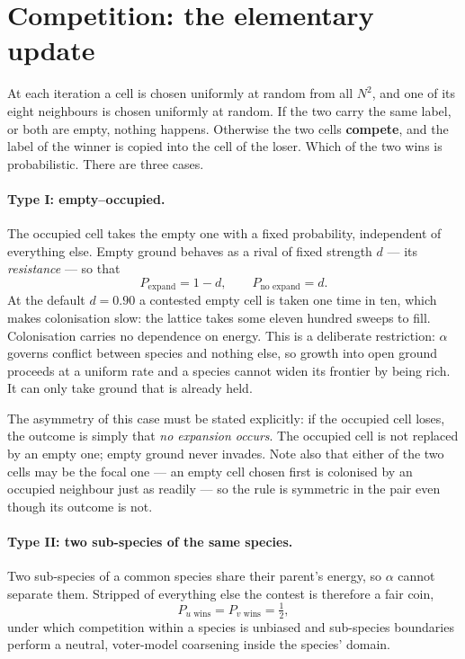 \documentclass[11pt,a4paper]{article}
\begin{document}
\section{Competition: the elementary update}
\label{sec:competition}

At each iteration a cell is chosen uniformly at random from all $N^2$, and one of its
eight neighbours is chosen uniformly at random. If the two carry the same label, or both
are empty, nothing happens. Otherwise the two cells \textbf{compete}, and the label of
the winner is copied into the cell of the loser. Which of the two wins is probabilistic.
There are three cases.

\paragraph{Type I: empty--occupied.} The occupied cell takes the empty one with a fixed
probability, independent of everything else. Empty ground behaves as a rival of fixed
strength $d$ --- its \emph{resistance} --- so that
\begin{equation}
  P_{\text{expand}} = 1 - d,
  \qquad
  P_{\text{no expand}} = d.
  \label{eq:typeI}
\end{equation}
At the default $d = 0.90$ a contested empty cell is taken one time in ten, which makes
colonisation slow: the lattice takes some eleven hundred sweeps to fill.
Colonisation carries no dependence on energy. This is a deliberate restriction: $\alpha$
governs conflict between species and nothing else, so growth into open ground proceeds at a
uniform rate and a species cannot widen its frontier by being rich. It can only take ground
that is already held.

The asymmetry of this case must be stated explicitly: if the occupied cell loses, the
outcome is simply that \emph{no expansion occurs}. The occupied cell is not replaced by an
empty one; empty ground never invades. Note also that either of the two cells may be the
focal one --- an empty cell chosen first is colonised by an occupied neighbour just as
readily --- so the rule is symmetric in the pair even though its outcome is not.

\paragraph{Type II: two sub-species of the same species.}
\label{sec:typeII}
Two sub-species of a common species share their parent's energy, so $\alpha$ cannot
separate them. Stripped of everything else the contest is therefore a fair coin,
\begin{equation}
  P_{u \text{ wins}} = P_{v \text{ wins}} = \tfrac12,
  \label{eq:typeIItie}
\end{equation}
under which competition within a species is unbiased and sub-species boundaries perform a
neutral, voter-model coarsening inside the species' domain.
\end{document}
